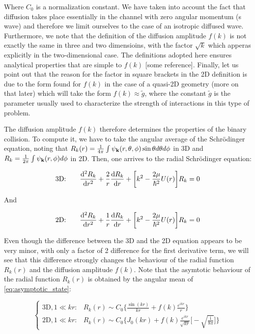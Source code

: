 Where $C_0$ is a normalization constant. We have taken into account the fact that diffusion takes place essentially in the channel with zero angular momentum (s wave) and therefore we limit ourselves to the case of an isotropic diffused wave. Furthermore, we note that the definition of the diffusion amplitude $f(k)$ is not exactly the same in three and two dimensioins, with the factor $\sqrt{k}$ which apperas explicitly in the two-dimensional case. The definitions adopted here ensures analytical properties that are simple to $f(k)$ [some reference]. Finally, let us point out that the reason for the factor in square brackets in the 2D definition is due to the form found for $f(k)$ in the case of a quasi-2D geometry (more on that later) which will take the form $f(k)\approx \tilde{g}$, where the constant $\tilde{g}$ is the parameter usually used to characterize the strength of interactions in this type of problem. 

The diffusion amplitude $f(k)$ therefore determines the properties of the binary collision. To compute it, we have to take the angular average of the Schrödinger equation, noting that $R_k(r)=\frac{1}{4\pi}\int \psi_{\vb k}(r,\theta,\phi)\sin\theta d\theta d\phi$ in 3D and $R_k=\frac{1}{2\pi}\int \psi_{\vb k}(r,\phi)d\phi$ in 2D. Then, one arrives to the radial Schrödinger equation:

\begin{equation}
    \text{3D:}\qquad \dv[2]{R_k}{r}+\frac{2}{r}\dv{R_k}{r}+\qty[k^2-\frac{2\mu}{\hbar^2}U(r)]R_k = 0
\end{equation}

And 

\begin{equation}
    \text{2D:}\qquad \dv[2]{R_k}{r}+\frac{1}{r}\dv{R_k}{r}+\qty[k^2-\frac{2\mu}{\hbar^2}U(r)]R_k = 0
\end{equation}

Even though the difference between the 3D and the 2D equation appears to be very minor, with only a factor of 2 difference for the first derivative term, we will see that this difference strongly changes the behaviour of the radial function $R_k(r)$ and the diffusion amplitude $f(k)$. Note that the asymtotic behaviour of the radial function $R_k(r)$ is obtained by the angular mean of \cref{eq:asymptotic_state}:

\begin{equation}
    \begin{cases}
        \text{3D},1\ll kr: & R_{k}(r) \sim C_0\biggl \{\frac{\sin(kr)}{kr} + f(k)\frac{e^{ikr}}{r}\biggr \} \\
        \text{2D},1\ll kr  : & R_{k}(r) \sim C_0\biggl \{J_0(kr) + f(k)\frac{e^{ikr}}{\sqrt{kr}}\biggl [ -\sqrt{\frac{\text{i}}{8\pi}}\biggr ]\biggr \}
    \end{cases}
\end{equation}

